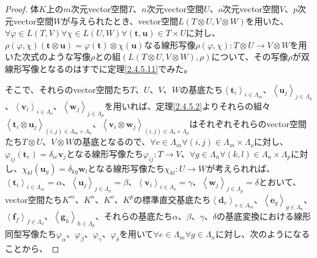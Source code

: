 \documentclass[dvipdfmx]{jsarticle}
\begin{document}
\begin{proof}
体$K$上の$m$次元vector空間$T$、$n$次元vector空間$U$、$o$次元vector空間$V$、$p$次元vector空間$W$が与えられたとき、vector空間$L(T \otimes U,V \otimes W)$を用いた、$\forall\varphi \in L(T,V)\forall\chi \in L(U,W)\forall\left( \mathbf{t},\mathbf{u} \right) \in T \times U$に対し、$\rho(\varphi,\chi)\left( \mathbf{t} \otimes \mathbf{u} \right) = \varphi\left( \mathbf{t} \right) \otimes \chi\left( \mathbf{u} \right)$なる線形写像$\rho(\varphi,\chi):T \otimes U \rightarrow V \otimes W$を用いた次式のような写像$\rho$との組$\left( L(T \otimes U,V \otimes W),\rho \right)$について、その写像$\rho$が双線形写像となるのはすでに定理\ref{2.4.5.11}でみた。\par
そこで、それらのvector空間たち$T$、$U$、$V$、$W$の基底たち$\left\langle \mathbf{t}_{i} \right\rangle_{i \in \varLambda_{m}}$、$\left\langle \mathbf{u}_{j} \right\rangle_{j \in \varLambda_{n}}$、$\left\langle \mathbf{v}_{i} \right\rangle_{i \in \varLambda_{o}}$、$\left\langle \mathbf{w}_{j} \right\rangle_{j \in \varLambda_{p}}$を用いれば、定理\ref{2.4.5.2}よりそれらの組々$\left\langle \mathbf{t}_{i} \otimes \mathbf{u}_{j} \right\rangle_{(i,j) \in \varLambda_{m} \times \varLambda_{n}}$、$\left\langle \mathbf{v}_{i} \otimes \mathbf{w}_{j} \right\rangle_{(i,j) \in \varLambda_{o} \times \varLambda_{p}}$はそれぞれそれらのvector空間たち$T \otimes U$、$V \otimes W$の基底となるので、$\forall e \in \varLambda_{m}\forall(i,j) \in \varLambda_{m} \times \varLambda_{o}$に対し、$\varphi_{ij}\left( \mathbf{t}_{e} \right) = \delta_{ie}\mathbf{v}_{j}$となる線形写像たち$\varphi_{ij}:T \rightarrow V$、$\forall g \in \varLambda_{n}\forall(k,l) \in \varLambda_{n} \times \varLambda_{p}$に対し、$\chi_{kl}\left( \mathbf{u}_{g} \right) = \delta_{kg}\mathbf{w}_{l}$となる線形写像たち$\chi_{kl}:U \rightarrow W$が考えられれば、$\left\langle \mathbf{t}_{i} \right\rangle_{i \in \varLambda_{m}} = \alpha$、$\left\langle \mathbf{u}_{j} \right\rangle_{j \in \varLambda_{n}} = \beta$、$\left\langle \mathbf{v}_{i} \right\rangle_{i \in \varLambda_{o}} = \gamma$、$\left\langle \mathbf{w}_{j} \right\rangle_{j \in \varLambda_{p}} = \delta$とおいて、vector空間たち$K^{m}$、$K^{n}$、$K^{o}$、$K^{p}$の標準直交基底たち$\left\langle \mathbf{d}_{e} \right\rangle_{e \in \varLambda_{m}}$、$\left\langle \mathbf{e}_{g} \right\rangle_{g \in \varLambda_{n}}$、$\left\langle \mathbf{f}_{f} \right\rangle_{f \in \varLambda_{o}}$、$\left\langle \mathbf{g}_{h} \right\rangle_{h \in \varLambda_{p}}$、それらの基底たち$\alpha$、$\beta$、$\gamma$、$\delta$の基底変換における線形同型写像たち$\varphi_{\alpha}$、$\varphi_{\beta}$、$\varphi_{\gamma}$、$\varphi_{\delta}$を用いて$\forall e \in \varLambda_{m}\forall g \in \varLambda_{n}$に対し、次のようになることから、

\end{proof}
\end{document}
